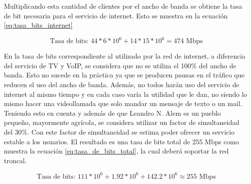 \documentclass[11pt,a4paper]{article}
\begin{document}
\begin{table}[htbp]
  \caption{porcentaje total de cada grupo que optara por cada uno de los packs.}
  \label{tab:porcent_total_packs}%
\end{table}%


Multiplicando esta cantidad de clientes por el ancho de banda se obtiene la tasa de bit necesaria para el servicio de internet. Esto se muestra en la ecuación \ref{eq:tasa_bits_internet}

\begin{equation}
    \text{Tasa de bits: } 44*6*10^6+14*15*10^6=474 \text{ Mbps}
    \label{eq:tasa_bits_internet}
\end{equation}

 En la tasa de bits correspondiente al utilizado por la red de internet, a diferencia del servicio de TV y VoIP, se considera que no se utiliza el 100\% del ancho de banda. 
 Esto no sucede en la práctica ya que se producen pausas en el tráfico que reducen el uso del ancho de banda. 
 Además, no todos harán uso del servicio de internet al mismo tiempo y en cada caso varía la utilidad que le dan, no siendo lo mismo hacer una videollamada que solo mandar un mensaje de texto o un mail. 
 Teniendo esto en cuenta y además de que Leandro N. Alem es un pueblo pequeño, mayormente agrícola, se considera utilizar un factor de simultaneidad del 30\%.
 Con este factor de simultaneidad se estima poder ofrecer un servicio estable a los usuarios.
 El resultado es una tasa de bits total de 255 Mbps como muestra la ecuación \ref{eq:tasa_de_bits_total}, la cual deberá soportar la red troncal.
 
 \begin{equation}
     \text{Tasa de bits: } 111*10^6+1.92*10^6+142.2*10^6\approx255 \text{ Mbps}
     \label{eq:tasa_de_bits_total}
 \end{equation}
\end{document}
